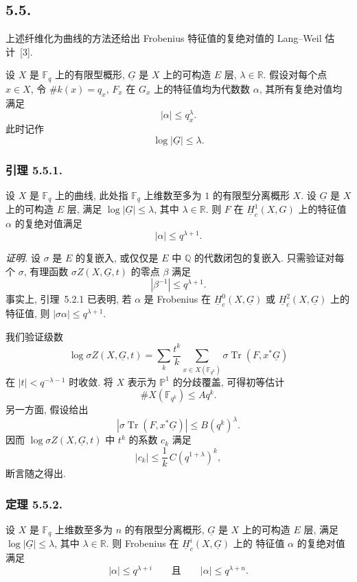 \subsection*{5.5.}
上述纤维化为曲线的方法还给出 Frobenius 特征值的复绝对值的 Lang--Weil 估计~[3].

设 $X$ 是 $\mathbb F_q$ 上的有限型概形, $\underline G$ 是 $X$ 上的可构造 $E$ 层,
$\lambda\in\mathbb R$. 假设对每个点 $x\in X$, 令 $\#k(x)=q_x$,
$F_x$ 在 $G_x$ 上的特征值均为代数数 $\alpha$, 其所有复绝对值均满足
\[
|\alpha|\leq q_x^\lambda.
\]
此时记作
\[
\log|\underline G|\leq\lambda.
\]

\subsubsection*{引理 5.5.1.}
设 $X$ 是 $\mathbb F_q$ 上的曲线, 此处指 $\mathbb F_q$ 上维数至多为 $1$
的有限型分离概形 $X$. 设 $\underline G$ 是 $X$ 上的可构造 $E$ 层,
满足 $\log|\underline G|\leq\lambda$, 其中 $\lambda\in\mathbb R$.
则 $F$ 在 $\underline H_c^1(X,G)$ 上的特征值 $\alpha$ 的复绝对值满足
\[
|\alpha|\leq q^{\lambda+1}.
\]

\medskip
\noindent\emph{证明.}
设 $\sigma$ 是 $E$ 的复嵌入, 或仅仅是 $E$ 中 $\mathbb Q$ 的代数闭包的复嵌入.
只需验证对每个 $\sigma$, 有理函数 $\sigma Z(X,\underline G,t)$ 的零点 $\beta$ 满足
\[
|\beta^{-1}|\leq q^{\lambda+1}.
\]
事实上, 引理~5.2.1 已表明, 若 $\alpha$ 是 Frobenius 在
$\underline H_c^0(X,\underline G)$ 或 $\underline H_c^2(X,\underline G)$ 上的特征值,
则 $|\sigma\alpha|\leq q^{\lambda+1}$.

我们验证级数
\[
\log\sigma Z(X,\underline G,t)
=\sum_k\frac{t^k}{k}
  \sum_{x\in X(\mathbb F_{q^k})}
  \sigma\operatorname{Tr}(F,x^*\underline G)
\]
在 $|t|<q^{-\lambda-1}$ 时收敛. 将 $X$ 表示为 $\mathbb P^1$ 的分歧覆盖,
可得初等估计
\[
\#X(\mathbb F_{q^k})\leq A q^k.
\]
另一方面, 假设给出
\[
\left|\sigma\operatorname{Tr}(F,x^*\underline G)\right|
\leq B(q^k)^\lambda.
\]
因而 $\log\sigma Z(X,\underline G,t)$ 中 $t^k$ 的系数 $c_k$ 满足
\[
|c_k|\leq\frac{1}{k}\,C(q^{1+\lambda})^k,
\]
断言随之得出.

\subsubsection*{定理 5.5.2.}
设 $X$ 是 $\mathbb F_q$ 上维数至多为 $n$ 的有限型分离概形,
$\underline G$ 是 $X$ 上的可构造 $E$ 层, 满足 $\log|\underline G|\leq\lambda$,
其中 $\lambda\in\mathbb R$. 则 Frobenius 在 $\underline H_c^i(X,\underline G)$ 上的
特征值 $\alpha$ 的复绝对值满足
\[
|\alpha|\leq q^{\lambda+i}
\qquad\text{且}\qquad
|\alpha|\leq q^{\lambda+n}.
\]

